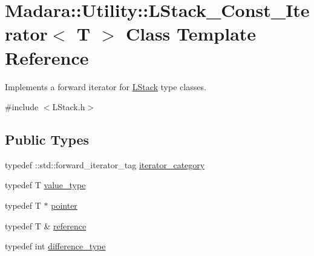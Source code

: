 \hypertarget{classMadara_1_1Utility_1_1LStack__Const__Iterator}{
\section{Madara::Utility::LStack\_\-Const\_\-Iterator$<$ T $>$ Class Template Reference}
\label{de/de3/classMadara_1_1Utility_1_1LStack__Const__Iterator}
}


Implements a forward iterator for \hyperlink{classMadara_1_1Utility_1_1LStack}{LStack} type classes.  




{\ttfamily \#include $<$LStack.h$>$}

\subsection*{Public Types}
\begin{DoxyCompactItemize}
\item 
typedef ::std::forward\_\-iterator\_\-tag \hyperlink{classMadara_1_1Utility_1_1LStack__Const__Iterator_a2577f2094e133444dad9302e05f97767}{iterator\_\-category}
\item 
typedef T \hyperlink{classMadara_1_1Utility_1_1LStack__Const__Iterator_ab91d664086c94ae01dd44bbac1e2fd47}{value\_\-type}
\item 
typedef T $\ast$ \hyperlink{classMadara_1_1Utility_1_1LStack__Const__Iterator_a2a2107e5cc28323409b2c5a8894d08e2}{pointer}
\item 
typedef T \& \hyperlink{classMadara_1_1Utility_1_1LStack__Const__Iterator_acd1e4824adc5fa88082861477b0fed8f}{reference}
\item 
typedef int \hyperlink{classMadara_1_1Utility_1_1LStack__Const__Iterator_ad90bc09c42a788b48b2d46591c3ca86f}{difference\_\-type}
\end{DoxyCompactItemize}
